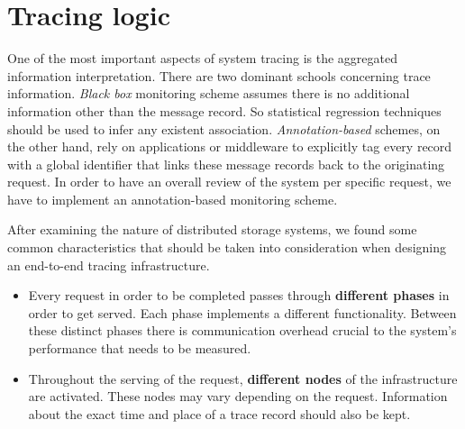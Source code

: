 \documentclass[a4paper,12pt]{article}
\begin{document}
\section{Tracing logic}
One of the most important aspects of system tracing is the aggregated 
information interpretation. There are two dominant schools concerning trace 
information. \emph{Black box} monitoring scheme assumes there is no additional 
information other than the message record. So statistical regression techniques
should be used to infer any existent association. \emph{Annotation-based}
schemes, on the other hand, rely on applications or middleware to explicitly tag
every record with a global identifier that links these message records back to
the originating request. In order to have an overall review of the system per 
specific request, we have to implement an annotation-based monitoring scheme.

After examining the nature of distributed storage systems, we found some common
characteristics that should be taken into consideration when designing an
end-to-end tracing infrastructure.
\begin{itemize}
\item Every request in order to be completed passes through \textbf{different 
phases} in order to get served. Each phase implements a different functionality.
Between these distinct phases there is communication overhead crucial to the 
system's performance that needs to be measured. 
\item Throughout the serving of the request, \textbf{different nodes} of the 
infrastructure are activated. These nodes may vary depending on the request.
Information about the exact time and place of a trace record should also be 
kept.
\end{itemize}
\end{document}
